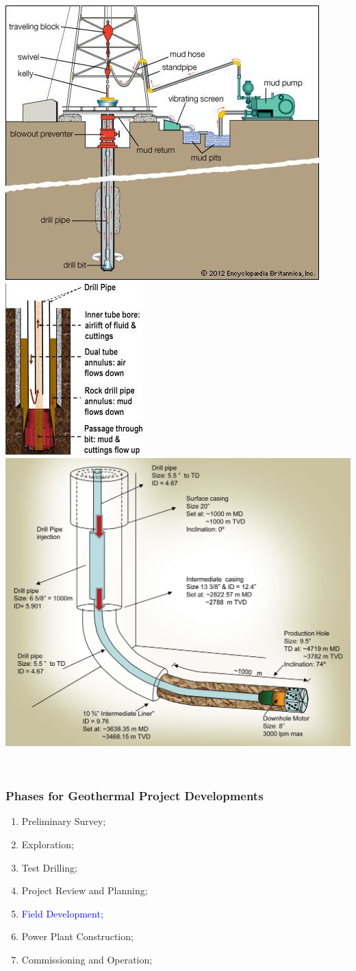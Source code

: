 \documentclass[10pt,compress]{beamer}
\newcommand{\blue}{\textcolor{blue}}
\begin{document}
\begin{frame}
\begin{columns}
\begin{column}[l]{0.55\linewidth}
{{             \includegraphics[width=0.5\columnwidth,clip]{./Pics/Drilling.jpg}
          }
          \hbox{
             \includegraphics[width=0.35\columnwidth,clip]{./Pics/DTRC_Diagram.jpg}\hspace{.53cm}
             \includegraphics[width=0.55\columnwidth,clip]{./Pics/web_Drillpipe_injection_well_profile-copy.jpg}
          }
       }
    \end{column}
  \end{columns}
\end{frame}
 

\begin{frame}
 \frametitle{Phases for Geothermal Project Developments} 
    \begin{enumerate}[1.]
       \item <1-> Preliminary Survey;
       \item <1-> Exploration; 
       \item <1-> Test Drilling;
       \item <1-> Project Review and Planning;
       \item <2-> \blue{Field Development}; 
       \item <1-> Power Plant Construction;
       \item <1-> Commissioning and Operation;
    \end{enumerate}
\end{frame}
\end{document}
